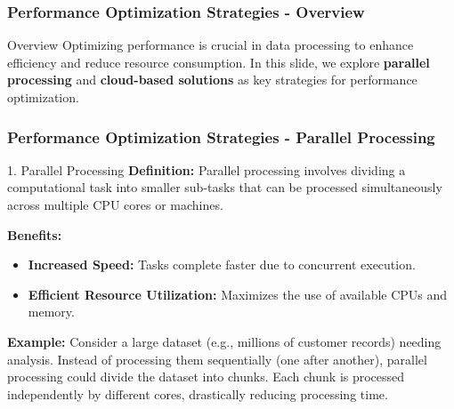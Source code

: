\documentclass[aspectratio=169]{beamer}
\begin{document}
\begin{frame}[fragile]
    \frametitle{Performance Optimization Strategies - Overview}
    \begin{block}{Overview}
        Optimizing performance is crucial in data processing to enhance efficiency and reduce resource consumption. 
        In this slide, we explore \textbf{parallel processing} and \textbf{cloud-based solutions} as key strategies for performance optimization.
    \end{block}
\end{frame}

\begin{frame}[fragile]
    \frametitle{Performance Optimization Strategies - Parallel Processing}
    \begin{block}{1. Parallel Processing}
        \textbf{Definition:} Parallel processing involves dividing a computational task into smaller sub-tasks that can be processed simultaneously across multiple CPU cores or machines.
        
        \textbf{Benefits:}
        \begin{itemize}
            \item \textbf{Increased Speed:} Tasks complete faster due to concurrent execution.
            \item \textbf{Efficient Resource Utilization:} Maximizes the use of available CPUs and memory.
        \end{itemize}

        \textbf{Example:} Consider a large dataset (e.g., millions of customer records) needing analysis. Instead of processing them sequentially (one after another), parallel processing could divide the dataset into chunks. Each chunk is processed independently by different cores, drastically reducing processing time.
    \end{block}
\end{frame}
\end{document}
